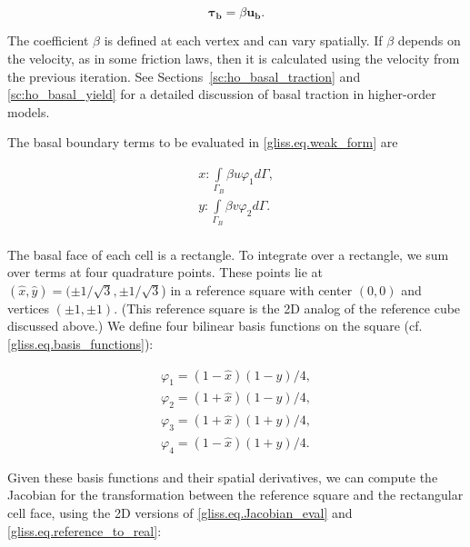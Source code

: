 \begin{equation}
  \label{gliss.eq.beta_tau}
  \mathbf{\tau_b} = \beta \mathbf{u_b}.  
\end{equation}

\noindent
The coefficient $\beta$ is defined at each vertex and can vary spatially.  
If $\beta$ depends on the velocity, as in some friction laws,
then it is calculated using the velocity from the previous iteration.
See Sections~\ref{sc:ho_basal_traction} and \ref{sc:ho_basal_yield}
for a detailed discussion of basal traction in higher-order models.

The basal boundary terms to be evaluated in \eqref{gliss.eq.weak_form} are

\begin{equation}
  \label{gliss.eq.basal_bc}
  \begin{split}
    x: \int\limits_{{\Gamma }_{B}} \beta u{{\varphi }_{1}} d\Gamma , \\
    y: \int\limits_{{\Gamma }_{B}} \beta v{{\varphi }_{2}} d\Gamma . \\
  \end{split}
\end{equation}

\noindent
The basal face of each cell is a rectangle. To integrate over a rectangle, we 
sum over terms at four quadrature points.  These points lie at $(\hat{x},\hat{y}) = (\pm 1/\sqrt{3}, \pm 1/\sqrt{3}$)
in a reference square with center $(0,0)$ and vertices $(\pm1,\pm1)$.
(This reference square is the 2D analog of the reference cube discussed above.)
We define four bilinear basis functions on the square (cf. \eqref{gliss.eq.basis_functions}):

\begin{equation}
  \label{gliss.eq.basis_functions_2d}
  \begin{matrix}
    {{\varphi }_{1}}=(1-\hat{x})(1-\hat{y})/4,  \\[3pt]
    {{\varphi }_{2}}=(1+\hat{x})(1-\hat{y})/4,  \\[3pt]
    {{\varphi }_{3}}=(1+\hat{x})(1+\hat{y})/4,  \\[3pt]
    {{\varphi }_{4}}=(1-\hat{x})(1+\hat{y})/4.
  \end{matrix}
\end{equation}

\noindent
Given these basis functions and their spatial derivatives, we can compute the Jacobian
for the transformation between the reference square and the rectangular cell face,
using the 2D versions of \eqref{gliss.eq.Jacobian_eval} and \eqref{gliss.eq.reference_to_real}:

